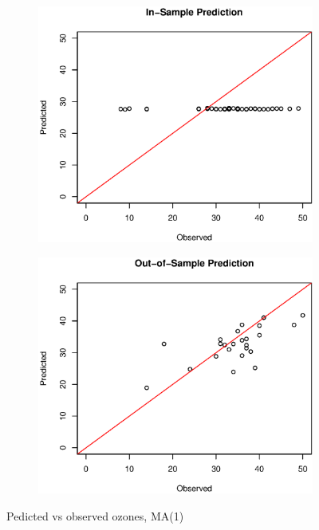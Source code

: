 \documentclass[12pt]{article}
\begin{document}
\begin{figure}[H]
\centering
\begin{subfigure}{.5\textwidth}
	\centering
	\includegraphics[scale = 0.4]{pred_in_ma.eps}
	\caption{}
\end{subfigure}%
\begin{subfigure}{.5\textwidth}
	\centering
	\includegraphics[scale = 0.4]{pred_out_ma.eps}
	\caption{}
\end{subfigure}
\caption{Pedicted vs observed ozones, MA(1)}
\end{figure}
\end{document}
